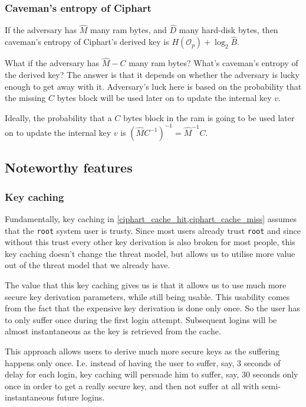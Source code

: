 \documentclass[twocolumn]{article}
\begin{document}
\subsubsection{Caveman's entropy of Ciphart}
If the adversary has $\hat M$ many \gls{ram} bytes, and $\hat D$
many hard-disk bytes, then caveman's entropy of Ciphart's derived
key is $H(\mathcal{O}_p) + \log_2 \hat B$.

What if the adversary has $\hat M - C$ many \gls{ram} bytes?
What's caveman's entropy of the derived key?  The answer is that it depends
on whether the adversary is lucky enough to get away with it.  Adversary's
luck here is based on the probability that the missing $C$ bytes block will
be used later on to update the internal key $v$.

Ideally, the probability that a $C$ bytes block in the \gls{ram} is going
to be used later on to update the internal key $v$ is $(\hat MC^{-1})^{-1}
= \hat M^{-1}C$.

\subsection{Noteworthy features}
\subsubsection{Key caching}
Fundamentally, key caching in \cref{ciphart_cache_hit,ciphart_cache_miss}
assumes that the \texttt{root} system user is trusty.  Since most users
already trust \texttt{root} and since without this trust every other key
derivation is also broken for most people, this key caching doesn't change
the threat model, but allows us to utilise more value out of the threat
model that we already have.

The value that this key caching gives us is that it allows us to use much
more secure key derivation parameters, while still being usable.  This
usability comes from the fact that the expensive key derivation is done
only once.  So the user has to only suffer once during the first login
attempt.  Subsequent logins will be almost instantaneous as the key is
retrieved from the cache.  

This approach allows users to derive much more secure keys as the suffering
happens only once.  I.e. instead of having the user to suffer, say, $3$
seconds of delay for each login, key caching will persuade him to suffer,
say, $30$ seconds only once in order to get a really secure key, and then
not suffer at all with semi-instantaneous future logins.
\end{document}
